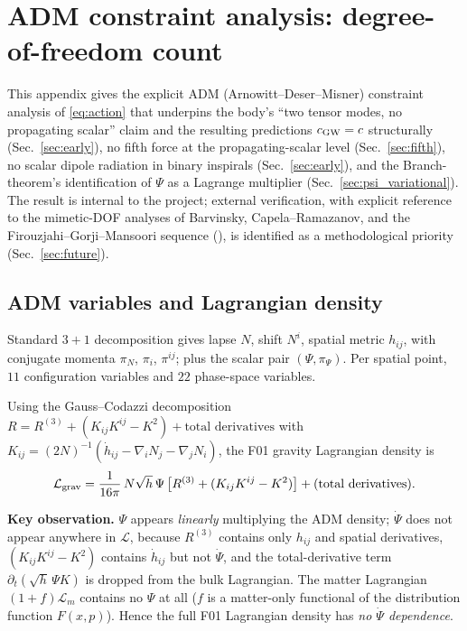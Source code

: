 \documentclass[aps,prd,twocolumn,nofootinbib,floatfix,superscriptaddress]{revtex4-2}
\newcommand{\Lm}{\mathcal{L}_m}
\begin{document}
\section{ADM constraint analysis: degree-of-freedom count}
\label{app:adm_dof}

This appendix gives the explicit ADM (Arnowitt--Deser--Misner)
constraint analysis of \eqref{eq:action} that underpins the body's
``two tensor modes, no propagating scalar'' claim and the resulting
predictions $c_{\rm GW}=c$ structurally (Sec.~\ref{sec:early}),
no fifth force at the propagating-scalar level (Sec.~\ref{sec:fifth}),
no scalar dipole radiation in binary inspirals (Sec.~\ref{sec:early}),
and the Branch-theorem's identification of $\Psi$ as a Lagrange
multiplier (Sec.~\ref{sec:psi_variational}). The result is internal
to the project; external verification, with explicit reference to
the mimetic-DOF analyses of Barvinsky, Capela--Ramazanov, and the
Firouzjahi--Gorji--Mansoori sequence
(\cite{Barvinsky2014,Capela2015,Firouzjahi2017,Gorji2018}), is
identified as a methodological priority (Sec.~\ref{sec:future}).

\subsection{ADM variables and Lagrangian density}

Standard $3+1$ decomposition gives lapse $N$, shift $N^i$, spatial
metric $h_{ij}$, with conjugate momenta $\pi_N$, $\pi_i$, $\pi^{ij}$;
plus the scalar pair $(\Psi,\pi_\Psi)$. Per spatial point, $11$
configuration variables and $22$ phase-space variables.

Using the Gauss--Codazzi decomposition
$R = R^{(3)} + (K_{ij}K^{ij}-K^2) + \text{total derivatives}$ with
$K_{ij}=(2N)^{-1}(\dot h_{ij}-\nabla_i N_j-\nabla_j N_i)$, the F01
gravity Lagrangian density is
\begin{equation}
\mathcal L_{\rm grav}
   = \frac{1}{16\pi}\,N\sqrt{h}\,\Psi\,\bigl[R^{(3)} + (K_{ij}K^{ij}-K^2)\bigr]
   + \text{(total derivatives)}.
\end{equation}

\textbf{Key observation.} $\Psi$ appears \emph{linearly}
multiplying the ADM density; $\dot\Psi$ does not appear anywhere
in $\mathcal L$, because $R^{(3)}$ contains only $h_{ij}$ and
spatial derivatives, $(K_{ij}K^{ij}-K^2)$ contains $\dot h_{ij}$ but
not $\dot\Psi$, and the total-derivative term
$\partial_t(\sqrt{h}\,\Psi K)$ is dropped from the bulk Lagrangian.
The matter Lagrangian $(1+f)\Lm$ contains no $\Psi$ at all ($f$ is
a matter-only functional of the distribution function $F(x,p)$).
Hence the full F01 Lagrangian density has \emph{no $\dot\Psi$
dependence}.
\end{document}
